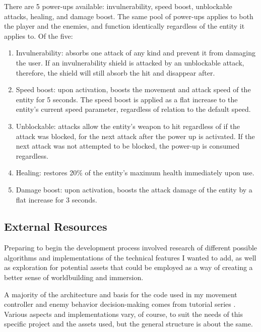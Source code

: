 \documentclass[10pt,twocolumn]{article}
\begin{document}
There are 5 power-ups available: invulnerability, speed boost, unblockable attacks, healing, and damage boost. The same pool of power-ups applies to both the player and the enemies, and function identically regardless of the entity it applies to. Of the five:

\begin{enumerate}
    \item Invulnerability: absorbs one attack of any kind and prevent it from damaging the user. If an invulnerability shield is attacked by an unblockable attack, therefore, the shield will still absorb the hit and disappear after.
    \item Speed boost: upon activation, boosts the movement and attack speed of the entity for 5 seconds. The speed boost is applied as a flat increase to the entity's current speed parameter, regardless of relation to the default speed. 
    \item Unblockable: attacks allow the entity's weapon to hit regardless of if the attack was blocked, for the next attack after the power up is activated. If the next attack was not attempted to be blocked, the power-up is consumed regardless. 
    \item Healing: restores 20\% of the entity's maximum health immediately upon use.
    \item Damage boost: upon activation, boosts the attack damage of the entity by a flat increase for 3 seconds. 

\end{enumerate}

\subsection{External Resources}
Preparing to begin the development process involved research of different possible algorithms and implementations of the technical features I wanted to add, as well as exploration for potential assets that could be employed as a way of creating a better sense of worldbuilding and immersion. 

A majority of the architecture and basis for the code used in my movement controller and enemy behavior decision-making comes from tutorial series  \cite{tutorial}. Various aspects and implementations vary, of course, to suit the needs of this specific project and the assets used, but the general structure is about the same. 
\end{document}
